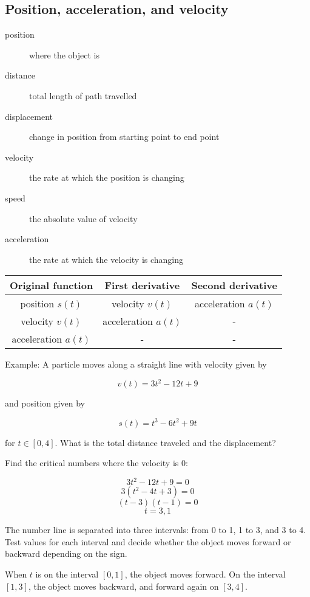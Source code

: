 \documentclass[letterpaper, 12pt]{article}
\begin{document}
\subsection*{Position, acceleration, and velocity}

\begin{description}
\item[position] where the object is
\item[distance] total length of path travelled 
\item[displacement] change in position from starting point to end point 
\item[velocity] the rate at which the position is changing
\item[speed] the absolute value of velocity
\item[acceleration] the rate at which the velocity is changing
\end{description}

\begin{table}[H]
\centering
\begin{tabular}{|c|c|c|}
\hline
\textbf{Original function} & \textbf{First derivative} & \textbf{Second derivative} \\\hline
position $s(t)$ & velocity $v(t)$ & acceleration $a(t)$ \\\hline
velocity $v(t)$ & acceleration $a(t)$ & - \\\hline
acceleration $a(t)$ & - & - \\
\hline
\end{tabular}
\end{table}

Example: A particle moves along a straight line with velocity given by

$$v(t) = 3t^2-12t+9$$

and position given by 

$$s(t) = t^3-6t^2+9t$$

for $t \in [0, 4]$. What is the total distance traveled and the displacement?

Find the critical numbers where the velocity is 0:

$$3t^2-12t+9 = 0$$
$$3(t^2-4t+3) = 0$$
$$(t-3)(t-1) = 0$$
$$t = 3, 1$$

The number line is separated into three intervals: from 0 to 1, 1 to 3, and 3 to 4. Test values for each interval and decide whether the object moves forward or backward depending on the sign.

When $t$ is on the interval $[0, 1]$, the object moves forward. On the interval $[1, 3]$, the object moves backward, and forward again on $[3, 4]$.
\end{document}
